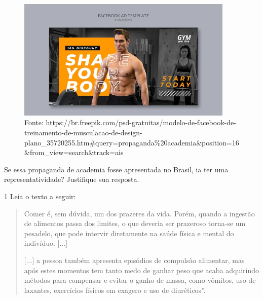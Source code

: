 \begin{figure}[htpb!]
\includegraphics[width=4.07407in,height=2.28999in]{./imgs/img4.jpg}
\caption{Fonte: https://br.freepik.com/psd-gratuitas/modelo-de-facebook-de-treinamento-de-musculacao-de-design-plano\_35720255.htm\#query=propaganda\%20academia\&position=16\&from\_view=search\&track=ais}
\end{figure}

Se essa propaganda de academia fosse apresentada no Brasil, ia ter uma
representatividade? Justifique sua resposta.




\num{1} Leia o texto a seguir:

\begin{quote}
Comer é, sem dúvida, um dos prazeres da vida. Porém, quando a ingestão
de alimentos passa dos limites, o que deveria ser prazeroso torna-se um
pesadelo, que pode intervir diretamente na saúde física e mental do
indivíduo. {[}...{]}

{[}...{]} a pessoa também apresenta episódios de compulsão alimentar,
mas após estes momentos tem tanto medo de ganhar peso que acaba
adquirindo métodos para compensar e evitar o ganho de massa, como
vômitos, uso de laxantes, exercícios físicos em exagero e uso de
diuréticos''.

\end{quote}

